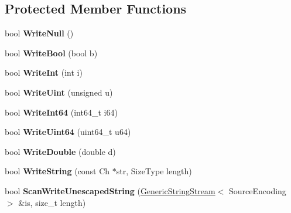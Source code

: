 \subsection*{Protected Member Functions}
\begin{DoxyCompactItemize}
\item 
bool {\bfseries Write\+Null} ()\hypertarget{class_writer_a44862b3eba8d84b909c69aba875c9f4d}{}\label{class_writer_a44862b3eba8d84b909c69aba875c9f4d}

\item 
bool {\bfseries Write\+Bool} (bool b)\hypertarget{class_writer_a42ad68b6950431bb8ca0199568546eaf}{}\label{class_writer_a42ad68b6950431bb8ca0199568546eaf}

\item 
bool {\bfseries Write\+Int} (int i)\hypertarget{class_writer_a31d0feda654ca245c41462be7dc59998}{}\label{class_writer_a31d0feda654ca245c41462be7dc59998}

\item 
bool {\bfseries Write\+Uint} (unsigned u)\hypertarget{class_writer_a2861227e93707d1478d2cf56644dca3b}{}\label{class_writer_a2861227e93707d1478d2cf56644dca3b}

\item 
bool {\bfseries Write\+Int64} (int64\+\_\+t i64)\hypertarget{class_writer_aa58d3f80c06394648de5055ecfb41587}{}\label{class_writer_aa58d3f80c06394648de5055ecfb41587}

\item 
bool {\bfseries Write\+Uint64} (uint64\+\_\+t u64)\hypertarget{class_writer_ad07b325157220e3aa791c1c8c904021e}{}\label{class_writer_ad07b325157220e3aa791c1c8c904021e}

\item 
bool {\bfseries Write\+Double} (double d)\hypertarget{class_writer_ae7a0fc4740681d845d92c1213bd25aa1}{}\label{class_writer_ae7a0fc4740681d845d92c1213bd25aa1}

\item 
bool {\bfseries Write\+String} (const Ch $\ast$str, Size\+Type length)\hypertarget{class_writer_acda4412ef5f4cac6e89f9544e4b10f70}{}\label{class_writer_acda4412ef5f4cac6e89f9544e4b10f70}

\item 
bool {\bfseries Scan\+Write\+Unescaped\+String} (\hyperlink{struct_generic_string_stream}{Generic\+String\+Stream}$<$ Source\+Encoding $>$ \&is, size\+\_\+t length)\hypertarget{class_writer_a94140803bba7863a1b39c936bbe6d262}{}\label{class_writer_a94140803bba7863a1b39c936bbe6d262}


\end{DoxyCompactItemize}
